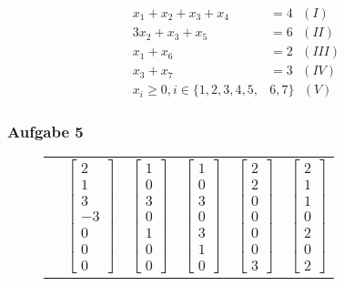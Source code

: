 \documentclass[a4paper, 12pt]{report}
\begin{document}
\begin{align*} 
  x_1 + x_2 + x_3 + x_4 &= 4 \text{  }(I)\\
  3x_2 + x_3 + x_5 &= 6 \text{  }(II)\\
  x_1 + x_6 &= 2 \text{  }(III)\\
  x_3 + x_7 &= 3 \text{  }(IV)\\
  x_i \geq 0, i \in \{1, 2, 3, 4, 5, &6, 7\} \text{  }(V)
\end{align*}

\subsubsection{Aufgabe 5}

\begin{figure}[H]
  \centering
  \def\arraystretch{1.25}
  \begin{tabular}{l|c c c c c}
    & $\begin{bmatrix} 2\\1\\3\\-3\\0\\0\\0 \end{bmatrix}$ & $\begin{bmatrix} 1\\0\\3\\0\\1\\0\\0 \end{bmatrix}$ & $\begin{bmatrix}1\\0\\3\\0\\3\\1\\0\end{bmatrix}$ & $\begin{bmatrix}2\\2\\0\\0\\0\\0\\3\end{bmatrix}$ & $\begin{bmatrix}2\\1\\1\\0\\2\\0\\2\end{bmatrix}$\\

\end{tabular}
\end{figure}
\end{document}

